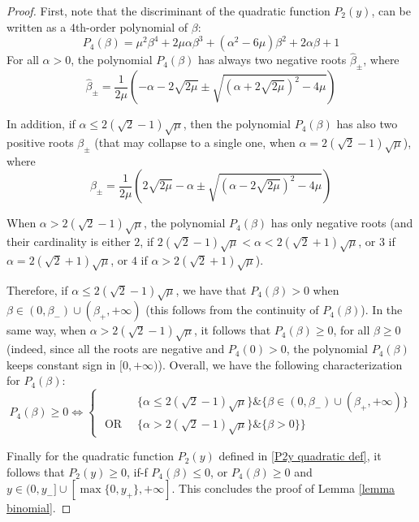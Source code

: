 \documentclass[reqno]{amsart}
\theoremstyle{plain}
\theoremstyle{definition}
\theoremstyle{remark}
\begin{document}
\begin{proof}
First, note that the discriminant of the quadratic function $P_2(y)$, can be written as a $4$th-order polynomial of $\beta$:
\begin{equation}\label{polynomial beta}
	P_{4}(\beta)=\mu^{2}\beta^{4}+2\mu\alpha\beta^{3} +(\alpha^{2}-6\mu)\beta^{2}+2\alpha\beta +1
\end{equation}
For all $\alpha> 0$, the polynomial $P_{4}(\beta)$ has always two negative roots $\hat{\beta}_{\pm}$, where
\begin{equation}
	\hat{\beta}_{\pm} = \frac{1}{2\mu}\left(-\alpha-2\sqrt{2\mu}\pm\sqrt{(\alpha+2\sqrt{2\mu})^{2}-4\mu}\right)
\end{equation}

In addition, if $\alpha \leq 2(\sqrt{2}-1)\sqrt{\mu}$, then the polynomial $P_{4}(\beta)$ has also two positive roots $\beta_{\pm}$ (that may collapse to a single one, when $\alpha = 2(\sqrt{2}-1)\sqrt{\mu}$), where 
\begin{equation}
	\beta_{\pm} = \frac{1}{2\mu}\left(2\sqrt{2\mu}-\alpha\pm\sqrt{(\alpha-2\sqrt{2\mu})^{2}-4\mu}\right)
\end{equation}

When $\alpha>2(\sqrt{2}-1)\sqrt{\mu}$, the polynomial $P_{4}(\beta)$ has only negative roots (and their cardinality is either $2$, if $2(\sqrt{2}-1)\sqrt{\mu}<\alpha<2(\sqrt{2}+1)\sqrt{\mu}$, or $3$ if $\alpha=2(\sqrt{2}+1)\sqrt{\mu}$, or $4$ if $\alpha>2(\sqrt{2}+1)\sqrt{\mu}$).

Therefore, if $\alpha\leq 2(\sqrt{2}-1)\sqrt{\mu}$, we have that $P_{4}(\beta)>0 $ when $\beta\in (0,\beta_{-})\cup(\beta_{+},+\infty)$ (this follows from the continuity of $P_{4}(\beta)$).
In the same way, when $\alpha > 2(\sqrt{2}-1)\sqrt{\mu}$, it follows that $P_{4}(\beta) \geq 0$, for all $\beta\geq 0$ (indeed, since all the roots are negative and $P_{4}(0)>0$, the polynomial $P_{4}(\beta)$ keeps constant sign in $[0,+\infty)$). Overall, we have the following characterization for $P_{4}(\beta)$:
\begin{equation}\label{P4bpositive}
	P_{4}(\beta) \geq 0 \Leftrightarrow \begin{cases}
		& \{\alpha \leq 2(\sqrt{2}-1)\sqrt{\mu}\} \& \{\beta\in (0,\beta_{-})\cup(\beta_{+},+\infty)\} \\
		\text{ OR } ~ &\{\alpha>2(\sqrt{2}-1)\sqrt{\mu}\} \& \{\beta>0\}\}
	\end{cases}
\end{equation}

Finally for the quadratic function $P_{2}(y)$ defined in \eqref{P2y quadratic def}, it follows that $P_{2}(y) \geq 0 $, if-f $P_{4}(\beta)\leq 0$, or $P_{4}(\beta)\geq 0$ and $y\in (0,y_{-}]\cup[\max\{0,y_{+}\},+\infty]$. This concludes the proof of Lemma \ref{lemma binomial}.
\end{proof}
\end{document}
